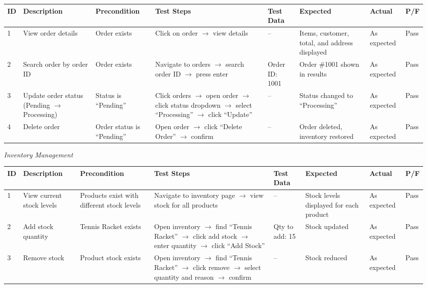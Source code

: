 \documentclass[12pt,a4paper]{report}
\begin{document}
\begin{center}
\footnotesize
\begin{longtable}{p{0.4cm} p{2.2cm} p{1.8cm} p{3.2cm} p{2.2cm} p{2.2cm} p{1.4cm} p{0.8cm}}
\toprule
\textbf{ID} & \textbf{Description} & \textbf{Precondition} & \textbf{Test Steps} & \textbf{Test Data} & \textbf{Expected} & \textbf{Actual} & \textbf{P/F}\\
\midrule
\endhead
1 & View order details & Order exists & Click on order $\to$ view details & -- & Items, customer, total, and address displayed & As expected & Pass\\[4pt]
2 & Search order by order ID & Order exists & Navigate to orders $\to$ search order ID $\to$ press enter & Order ID: 1001 & Order \#1001 shown in results & As expected & Pass\\[4pt]
3 & Update order status (Pending $\to$ Processing) & Status is ``Pending'' & Click orders $\to$ open order $\to$ click status dropdown $\to$ select ``Processing'' $\to$ click ``Update'' & -- & Status changed to ``Processing'' & As expected & Pass\\[4pt]
4 & Delete order & Order status is ``Pending'' & Open order $\to$ click ``Delete Order'' $\to$ confirm & -- & Order deleted, inventory restored & As expected & Pass\\
\bottomrule
\end{longtable}
\end{center}

\textit{Inventory Management}

\begin{center}
\footnotesize
\begin{longtable}{p{0.4cm} p{2.2cm} p{1.8cm} p{3.2cm} p{2.2cm} p{2.2cm} p{1.4cm} p{0.8cm}}
\toprule
\textbf{ID} & \textbf{Description} & \textbf{Precondition} & \textbf{Test Steps} & \textbf{Test Data} & \textbf{Expected} & \textbf{Actual} & \textbf{P/F}\\
\midrule
\endhead
1 & View current stock levels & Products exist with different stock levels & Navigate to inventory page $\to$ view stock for all products & -- & Stock levels displayed for each product & As expected & Pass\\[4pt]
2 & Add stock quantity & Tennis Racket exists & Open inventory $\to$ find ``Tennis Racket'' $\to$ click add stock $\to$ enter quantity $\to$ click ``Add Stock'' & Qty to add: 15 & Stock updated & As expected & Pass\\[4pt]
3 & Remove stock & Product stock exists & Open inventory $\to$ find ``Tennis Racket'' $\to$ click remove $\to$ select quantity and reason $\to$ confirm & -- & Stock reduced & As expected & Pass\\
\bottomrule
\end{longtable}
\end{center}
\end{document}
